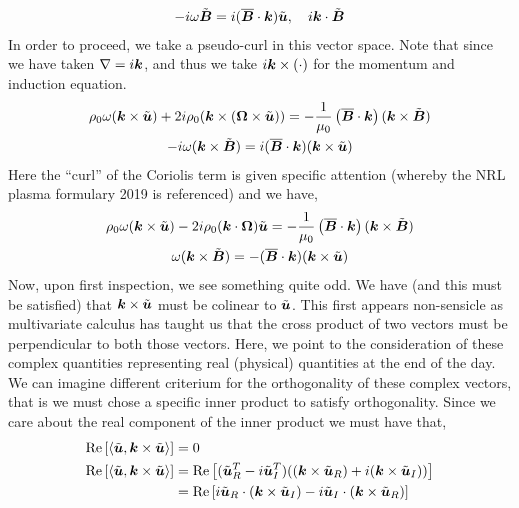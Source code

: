 \documentclass{article}
\begin{document}
\begin{enumerate}[label=\alph*.)]
\begin{gather*}
        -i\omega\tilde{\boldsymbol{B}} = i(\overline{\boldsymbol{B}}\cdot\boldsymbol{k})\tilde{\boldsymbol{u}}, \quad
        i\boldsymbol{k}\cdot\tilde{\boldsymbol{B}}
    \end{gather*}
    In order to proceed, we take a pseudo-curl in this vector space. Note that
    since we have taken $\nabla = i\boldsymbol{k}$, and thus we take $i\boldsymbol{k}\times(\cdot)$ for
    the momentum and induction equation. 
    \begin{gather*}
        \rho_0\omega(\boldsymbol{k}\times\tilde{\boldsymbol{u}}) +
        2i\rho_0(\boldsymbol{k}\times(\boldsymbol{\Omega}\times\tilde{\boldsymbol{u}})) =
        - \frac{1}{\mu_0}\left(\overline{\boldsymbol{B}}\cdot\boldsymbol{k}\right)(\boldsymbol{k}\times\tilde{\boldsymbol{B}})\\
        -i\omega(\boldsymbol{k}\times\tilde{\boldsymbol{B}}) = i(\overline{\boldsymbol{B}}\cdot\boldsymbol{k})(\boldsymbol{k}\times\tilde{\boldsymbol{u}})
    \end{gather*}
    Here the ``curl'' of the Coriolis term is given specific attention (whereby
    the NRL plasma formulary 2019 is referenced) and we have,
    \begin{gather*}
        \rho_0\omega(\boldsymbol{k}\times\tilde{\boldsymbol{u}}) -
        2i\rho_0(\boldsymbol{k}\cdot\boldsymbol{\Omega})\tilde{\boldsymbol{u}} =
        - \frac{1}{\mu_0}\left(\overline{\boldsymbol{B}}\cdot\boldsymbol{k}\right)(\boldsymbol{k}\times\tilde{\boldsymbol{B}})\\
        \omega(\boldsymbol{k}\times\tilde{\boldsymbol{B}}) = -(\overline{\boldsymbol{B}}\cdot\boldsymbol{k})(\boldsymbol{k}\times\tilde{\boldsymbol{u}})
    \end{gather*}
    Now, upon first inspection, we see something quite odd. We have (and this
    must be satisfied) that $\boldsymbol{k}\times\tilde{\boldsymbol{u}}$ must be colinear to
    $\tilde{\boldsymbol{u}}$. This first appears non-sensicle as multivariate calculus
    has taught us that the cross product of two vectors must be perpendicular to
    both those vectors. Here, we point to the consideration of these complex
    quantities representing real (physical) quantities at the end of the day. We
    can imagine different criterium for the orthogonality of these complex
    vectors, that is we must chose a specific inner product to satisfy
    orthogonality. Since we care about the real component of the inner product
    we must have that, 
    \begin{align*}
        \real{\left<\tilde{\uvec},\k\times\tilde{\uvec}\right>} &= 0\\
        \real{\left<\tilde{\uvec},\k\times\tilde{\uvec}\right>} &=
        \real{(\tilde{\uvec}_R^T -i\tilde{\uvec}_I^T) ((\k\times\tilde{\uvec}_R) +
        i(\k\times\tilde{\uvec}_I))}\\
        &= \real{i\tilde{\uvec}_R\cdot(\k\times\tilde{\uvec}_I)
        -i\tilde{\uvec}_I\cdot(\k\times\tilde{\uvec}_R)}\\

\end{align*}
\end{enumerate}
\end{document}
